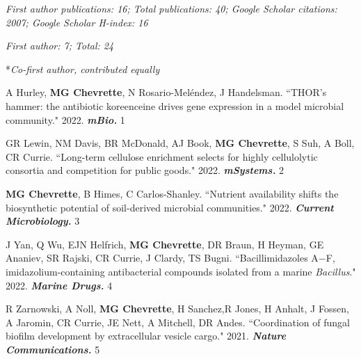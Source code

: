 

\textit{First author publications: 16; Total publications: 40; Google Scholar citations: 2007; Google Scholar H-index: 16}

 \vspace{-2mm}

\begin{cvpubs}

\cvpub
{\hspace{-1cm} \textit{First author: 7; Total: 24}}
{}

\cvpub
{\hspace{-1cm} *\textit{Co-first author, contributed equally}} %
{}

\cvpub
{A Hurley, \textbf{MG Chevrette}, N Rosario-Mel\'{e}ndez, J Handelsman. ``THOR's hammer: the antibiotic koreenceine drives gene expression in a model microbial community." 2022. \textit{\textbf{mBio.}} \textit{\textbf{}}}
{1}

\cvpub
{GR Lewin, NM Davis, BR McDonald, AJ Book, \textbf{MG Chevrette}, S Suh, A Boll, CR Currie. ``Long-term cellulose enrichment selects for highly cellulolytic consortia and competition for public goods." 2022. \textit{\textbf{mSystems.}} \textit{\textbf{}}}
{2}

\cvpub
{\textbf{MG Chevrette}, B Himes, C Carlos-Shanley. ``Nutrient availability shifts the biosynthetic potential of soil-derived microbial communities." 2022. \textit{\textbf{Current Microbiology.}} \textit{\textbf{}}}
{3}

\cvpub
{J Yan, Q Wu, EJN Helfrich, \textbf{MG Chevrette}, DR Braun, H Heyman,  GE Ananiev, SR Rajski, CR Currie, J Clardy, TS Bugni. ``Bacillimidazoles A−F, imidazolium-containing antibacterial compounds isolated from a marine \textit{Bacillus}." 2022. \textit{\textbf{Marine Drugs.}} \textit{\textbf{}}}
{4}

\cvpub
{R Zarnowski, A Noll, \textbf{MG Chevrette}, H Sanchez,R Jones, H Anhalt, J Fossen, A Jaromin, CR Currie, JE Nett, A Mitchell, DR Andes. ``Coordination of fungal biofilm development by extracellular vesicle cargo." 2021. \textit{\textbf{Nature Communications.}} \textit{\textbf{}}}
{5}


\end{cvpubs}
